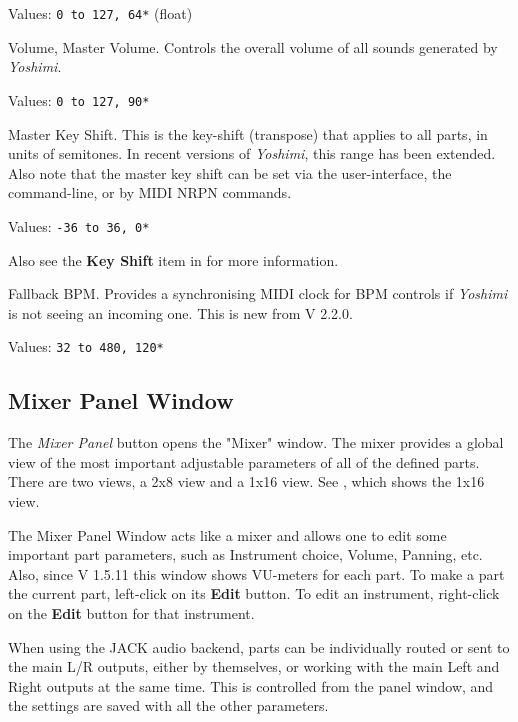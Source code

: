    Values: \texttt{0 to 127, 64*} (float)

   Volume, Master Volume.
   Controls the overall volume of all sounds generated by
   \textsl{Yoshimi}.

   Values: \texttt{0 to 127, 90*}

   Master Key Shift.
   This is the key-shift (transpose) that applies to all parts, in units of
   semitones.
   In recent versions of \textsl{Yoshimi}, this range has been extended.
   Also note that the master key shift can be set via the user-interface, the
   command-line, or by MIDI NRPN commands.

   Values: \texttt{-36 to 36, 0*}

   Also see the \textbf{Key Shift} item in
   \hspace{6 pt}for more information.


   Fallback BPM.
   Provides a synchronising MIDI clock for BPM controls if
   \textsl{Yoshimi} is not seeing an incoming one.
   This is new from V 2.2.0.

   Values: \texttt{32 to 480, 120*}

\subsection{Mixer Panel Window}
\label{subsec:mixer_panel_window}

   The \textsl{Mixer Panel} button opens the "Mixer" window.
   The mixer provides a global view of the most important
   adjustable parameters of all of the defined parts.
   There are two views, a 2x8 view and a 1x16 view.
   See , which
   shows the 1x16 view.

   The Mixer Panel Window acts like a mixer and allows one to edit some important
   part parameters, such as Instrument choice, Volume, Panning, etc.\\
   Also, since V 1.5.11 this window shows VU-meters for each part.
   To make a part the current part, left-click on its \textbf{Edit} button.
   To edit an instrument, right-click on the \textbf{Edit} button for that
   instrument.

   When using the JACK audio backend, parts can be individually routed or sent
   to the main L/R outputs, either by themselves, or working with the main Left
   and Right outputs at the same time.  This is controlled from the panel
   window, and the settings are saved with all the other parameters.


